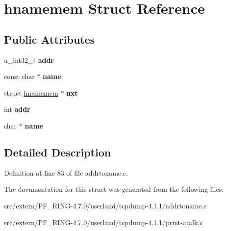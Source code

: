 \hypertarget{structhnamemem}{
\section{hnamemem Struct Reference}
\label{structhnamemem}
}
\subsection*{Public Attributes}
\begin{DoxyCompactItemize}
\item 
\hypertarget{structhnamemem_aff1c97e6a192ab4c3d460c2bf79e9526}{
u\_\-int32\_\-t {\bfseries addr}}
\label{structhnamemem_aff1c97e6a192ab4c3d460c2bf79e9526}

\item 
\hypertarget{structhnamemem_a5c86638462c210af25304a2ee1a3514c}{
const char $\ast$ {\bfseries name}}
\label{structhnamemem_a5c86638462c210af25304a2ee1a3514c}

\item 
\hypertarget{structhnamemem_aa43ada65d6045531946505bcdeebe3f6}{
struct \hyperlink{structhnamemem}{hnamemem} $\ast$ {\bfseries nxt}}
\label{structhnamemem_aa43ada65d6045531946505bcdeebe3f6}

\item 
\hypertarget{structhnamemem_afedb5c7f45fc9979b00f417abad177b0}{
int {\bfseries addr}}
\label{structhnamemem_afedb5c7f45fc9979b00f417abad177b0}

\item 
\hypertarget{structhnamemem_a5d5f7ede3fcee4ce3599f94587215e28}{
char $\ast$ {\bfseries name}}
\label{structhnamemem_a5d5f7ede3fcee4ce3599f94587215e28}

\end{DoxyCompactItemize}


\subsection{Detailed Description}


Definition at line 83 of file addrtoname.c.



The documentation for this struct was generated from the following files:\begin{DoxyCompactItemize}
\item 
src/extern/PF\_\-RING-\/4.7.0/userland/tcpdump-\/4.1.1/addrtoname.c\item 
src/extern/PF\_\-RING-\/4.7.0/userland/tcpdump-\/4.1.1/print-\/atalk.c\end{DoxyCompactItemize}
